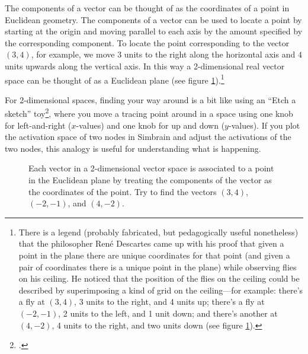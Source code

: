    The components of a vector can be thought of as the coordinates of a point
in Euclidean geometry. The components of a vector can be used to locate a
point by starting at the origin and moving parallel to each axis by the 
amount specified by the corresponding component. To locate the point corresponding to the vector 
$(3,4)$, for example, we move $3$ units to the right along the 
horizontal axis and $4$ units upwards along the vertical axis. In this way a 
2-dimensional real vector space can be thought of as a Euclidean plane (see
figure \ref{2d}).\footnote{There is a legend (probably fabricated, but pedagogically useful nonetheless) \cite[p.~143]{forbes1977descartes}
that the philosopher Ren{\'{e}} Descartes 
 came up with his proof that given a point in the plane there are unique coordinates for that 
 point (and given a pair of coordinates there is a unique point in the plane) 
 while observing flies on his ceiling. He 
 noticed that the position of the flies on the ceiling could be described by 
 superimposing a kind of grid on the ceiling---for example: there's a fly at 
 $(3,4)$, 3 units to the right, and 4 units up; there's a fly at 
 $(-2,-1)$, 2 units to the left, and 1 unit down; and there's another at 
 $(4,-2)$, 4 units to the right, and two units down (see figure \ref{2d}).}
 
For 2-dimensional spaces, finding your way around is a bit like using an ``Etch a sketch'' toy\footnote{.}, where you move a tracing point around in a space using one knob for left-and-right ($x$-values) and one knob for up and down ($y$-values). If you plot the activation space of two nodes in Simbrain and adjust the activations of the two nodes, this analogy is useful for understanding what is happening.

\begin{figure}[h]
\centering
{}
\caption[Scott Hotton.]{Each vector in a 2-dimensional vector space is associated to a point 
in the Euclidean plane by treating the components of the vector as the 
coordinates of the point. Try to find the vectors $(3,4)$, $(-2,-1)$, and 
$(4,-2)$.} 
\label{2d}
\end{figure}

